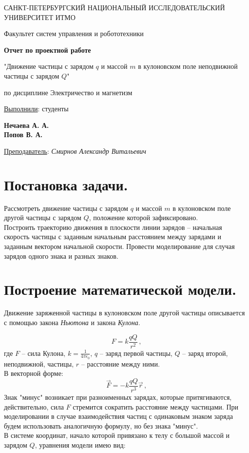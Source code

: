 \documentclass[a5paper, 10pt]{article}
\theoremstyle{definition}
\theoremstyle{plain}
\theoremstyle{remark}
\newcommand*{\titlePage}{
	\thispagestyle{title}
	\begingroup
	\begin{center}
		
		\vspace*{6ex}
		
		{\small
			САНКТ-ПЕТЕРБУРГСКИЙ НАЦИОНАЛЬНЫЙ ИССЛЕДОВАТЕЛЬСКИЙ УНИВЕРСИТЕТ ИТМО	
		}
		
		\vspace*{2ex}
		
		{\normalsize
			Факультет систем управления и робототехники
		}
		
		\vspace*{15ex}
		
		{\Large \bfseries 
			Отчет по проектной работе
		}
\vspace*{2ex}
	{\Large \bfseries 
			
 "Движение частицы с зарядом $q$ и массой $m$ в кулоновском поле неподвижной частицы с зарядом $Q$"
		}
\vspace*{2ex}
		
		{\normalsize
			по дисциплине Электричество и магнетизм
		}

	\end{center}
	\vspace*{20ex}
	\begin{flushright}
		{\large 
			\underline{Выполнили}: студенты \\
			\begin{flushright}
				\textbf{Нечаева А. А.}\\
                               \textbf{Попов В. А.}\\
			\end{flushright}
		}
		
		\vspace*{5ex}
		
		{\large 
			\underline{Преподаватель}: \textit{Смирнов Александр Витальевич}
		}
	\end{flushright}	
	\newpage
	\setcounter{page}{1}
	\endgroup}
\begin{document}
	\titlePage
	\pagestyle{style}

\newpage



\section{Постановка задачи.}
Рассмотреть движение частицы с зарядом $q$ и массой $m$ в кулоновском поле другой частицы с зарядом $Q$, положение которой зафиксировано.\\
Построить траекторию движения в плоскости линии зарядов -- начальная скорость частицы с заданным начальным расстоянием между зарядами и заданным вектором начальной скорости. Провести моделирование для случая зарядов одного знака и разных знаков.




\section{Построение математической модели.}
Движение заряженной частицы в кулоновском поле другой частицы описывается с помощью закона \textit{Ньютона} и закона \textit{Кулона}.

\begin{equation}
F = k \frac{qQ}{r^2}\, ,
\end{equation}
где $F$ -- сила Кулона, $ k = \frac{1}{4 \pi \epsilon_0}$, $q$ -- заряд первой частицы, $Q$ -- заряд второй, неподвижной, частицы, $r$ -- расстояние между ними.\\
В векторной форме:
\begin{equation}
\vec{F} =- k \frac{qQ}{r^3} \vec{r}\, ,
\end{equation}
Знак "минус" возникает при разноименных зарядах, которые притягиваются, действительно, сила $F$ стремится сократить расстояние между частицами. При моделировании в случае взаимодействия частиц с одинаковым знаком заряда будем использовать аналогичную формулу, но без знака "минус".\\
В системе координат, начало которой привязано к телу с большой массой и зарядом $Q$, уравнения модели имею вид:
\end{document}

